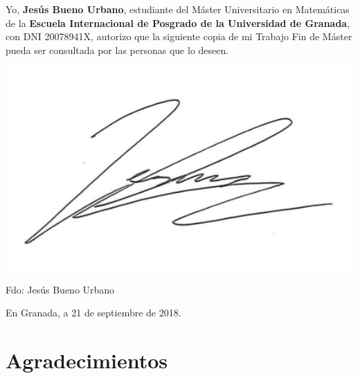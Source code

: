 


\chapter*{}
\thispagestyle{empty}

\noindent{\rule[-1ex]{\textwidth}{2pt}\\[4.5ex]}
Yo, \textbf{Jesús Bueno Urbano}, estudiante del Máster Universitario en Matemáticas de la \textbf{Escuela Internacional de Posgrado de la Universidad de Granada}, con DNI 20078941X, autorizo que la siguiente copia de mi Trabajo Fin de Máster pueda ser consultada por las personas que lo deseen.

\vspace{2cm}

\includegraphics[scale=0.3]{images/firma.png}

\vspace{1cm}

\noindent Fdo: Jesús Bueno Urbano

\vspace{2cm}

\begin{flushright}
En Granada, a 21 de septiembre de 2018.
\end{flushright}


\chapter*{Agradecimientos}
\thispagestyle{empty}
\vspace{1cm}

